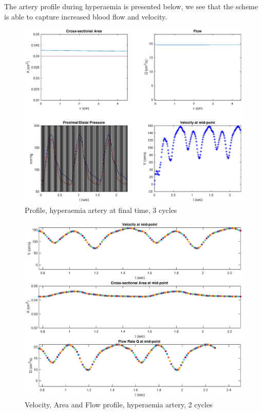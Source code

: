 \documentclass[12pt]{article} %
\begin{document}
The artery profile during hyperaemia is presented below, we see that the scheme is able to capture increased blood flow and velocity.
\begin{figure}[h!]
\caption{Profile, hyperaemia artery at final time, 3 cycles}
\centering
\includegraphics[width=1.0\textwidth]{hyper4.eps}
\end{figure}
\newpage
\begin{figure}[h!]
\caption{Velocity, Area and Flow profile, hyperaemia artery, 2 cycles}
\centering
\includegraphics[width=1.0\textwidth]{hyper3.eps}
\end{figure}
\
\newpage
\
\end{document}
